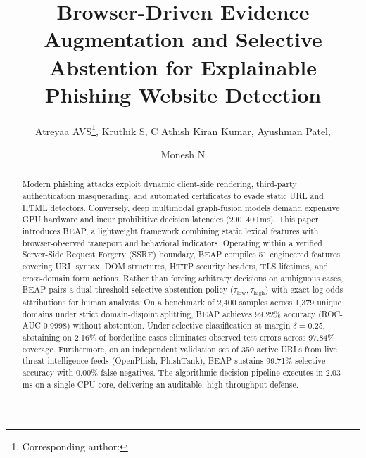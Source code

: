 \documentclass{llncs}
\begin{document}
\title{Browser-Driven Evidence Augmentation and Selective Abstention for Explainable Phishing Website Detection}

\author{Atreyaa AVS\thanks{Corresponding author: }, Kruthik S, C Athish Kiran Kumar, Ayushman Patel, \and Monesh N}


\maketitle

\begin{abstract}
Modern phishing attacks exploit dynamic client-side rendering, third-party authentication masquerading, and automated certificates to evade static URL and HTML detectors. Conversely, deep multimodal graph-fusion models demand expensive GPU hardware and incur prohibitive decision latencies (200--400\,ms). This paper introduces BEAP, a lightweight framework combining static lexical features with browser-observed transport and behavioral indicators. Operating within a verified Server-Side Request Forgery (SSRF) boundary, BEAP compiles 51 engineered features covering URL syntax, DOM structures, HTTP security headers, TLS lifetimes, and cross-domain form actions. Rather than forcing arbitrary decisions on ambiguous cases, BEAP pairs a dual-threshold selective abstention policy ($\tau_{\text{low}}, \tau_{\text{high}}$) with exact log-odds attributions for human analysts. On a benchmark of 2,400 samples across 1,379 unique domains under strict domain-disjoint splitting, BEAP achieves 99.22\% accuracy (ROC-AUC 0.9998) without abstention. Under selective classification at margin $\delta = 0.25$, abstaining on 2.16\% of borderline cases eliminates observed test errors across 97.84\% coverage. Furthermore, on an independent validation set of 350 active URLs from live threat intelligence feeds (OpenPhish, PhishTank), BEAP sustains 99.71\% selective accuracy with 0.00\% false negatives. The algorithmic decision pipeline executes in 2.03\,ms on a single CPU core, delivering an auditable, high-throughput defense.
\end{abstract}
\end{document}
